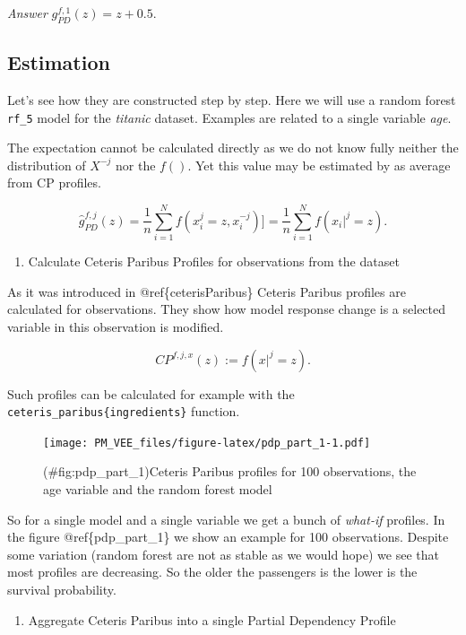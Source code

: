 \documentclass[12pt,]{krantz}
\providecommand{\tightlist}{%
  \setlength{\itemsep}{0pt}\setlength{\parskip}{0pt}}
\theoremstyle{definition}
\theoremstyle{definition}
\theoremstyle{definition}
\theoremstyle{remark}
\begin{document}
\emph{Answer} \(g_{PD}^{f, 1}(z) = z + 0.5\).

\hypertarget{estimation}{%
\subsection{Estimation}\label{estimation}}

Let's see how they are constructed step by step. Here we will use a
random forest \texttt{rf\_5} model for the \emph{titanic} dataset.
Examples are related to a single variable \emph{age}.

The expectation cannot be calculated directly as we do not know fully
neither the distribution of \(X^{-j}\) nor the \(f()\). Yet this value
may be estimated by as average from CP profiles.

\[
\hat g_{PD}^{f, j}(z) = \frac 1n \sum_{i=1}^{N} f(x_i^j=z, x^{-j}_i)] = \frac 1n \sum_{i=1}^{N} f(x_i|^j=z).
\]

\begin{enumerate}
\def\labelenumi{\arabic{enumi}.}
\tightlist
\item
  Calculate Ceteris Paribus Profiles for observations from the dataset
\end{enumerate}

As it was introduced in @ref\{ceterisParibus\} Ceteris Paribus profiles
are calculated for observations. They show how model response change is
a selected variable in this observation is modified.

\[
CP^{f, j, x}(z) := f(x|^j = z).
\]

Such profiles can be calculated for example with the
\texttt{ceteris\_paribus\{ingredients\}} function.

\begin{figure}
\centering
\texttt{[image: PM\_VEE\_files/figure-latex/pdp\_part\_1-1.pdf]}
\caption{(\#fig:pdp\_part\_1)Ceteris Paribus profiles for 100
observations, the age variable and the random forest model}
\end{figure}

So for a single model and a single variable we get a bunch of
\emph{what-if} profiles. In the figure @ref\{pdp\_part\_1\} we show an
example for 100 observations. Despite some variation (random forest are
not as stable as we would hope) we see that most profiles are
decreasing. So the older the passengers is the lower is the survival
probability.

\begin{enumerate}
\def\labelenumi{\arabic{enumi}.}
\setcounter{enumi}{1}
\tightlist
\item
  Aggregate Ceteris Paribus into a single Partial Dependency Profile
\end{enumerate}
\end{document}
